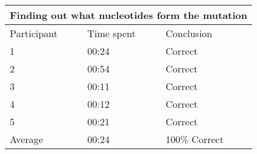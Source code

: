 \begin{center}
	\begin{tabular}{| l | l | l |}
		\hline
		\multicolumn{3}{|c|}{Finding out what nucleotides form the mutation} \\
		\hline
		Participant & Time spent & Conclusion\\
		\hline
		1 & 00:24 & Correct\\
		2 & 00:54 & Correct\\
		3 & 00:11 & Correct\\
		4 & 00:12 & Correct\\
		5 & 00:21 & Correct\\
		\hline
		Average & 00:24 & 100\% Correct\\
		\hline
	\end{tabular}
\end{center}